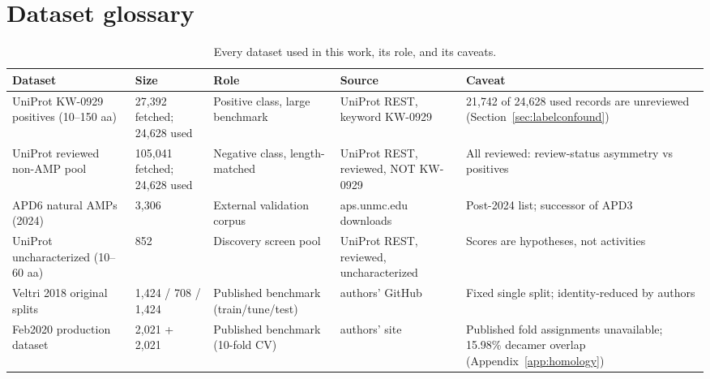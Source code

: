 
\section{Dataset glossary}\label{app:datasets}
\begin{table}[h]\centering\scriptsize
\caption{Every dataset used in this work, its role, and its caveats.}
\label{tab:datasets}
\begin{tabular}{p{3.2cm}p{1.6cm}p{2.6cm}p{3.4cm}p{4.2cm}}
\hline
Dataset & Size & Role & Source & Caveat \\
\hline
UniProt KW-0929 positives (10--150 aa) & 27{,}392 fetched; 24{,}628 used &
Positive class, large benchmark & UniProt REST, keyword KW-0929 &
21{,}742 of 24{,}628 used records are unreviewed (Section~\ref{sec:labelconfound}) \\
UniProt reviewed non-AMP pool & 105{,}041 fetched; 24{,}628 used &
Negative class, length-matched & UniProt REST, reviewed, NOT KW-0929 &
All reviewed: review-status asymmetry vs positives \\
APD6 natural AMPs (2024) & 3{,}306 & External validation corpus &
aps.unmc.edu downloads & Post-2024 list; successor of APD3 \\
UniProt uncharacterized (10--60 aa) & 852 & Discovery screen pool &
UniProt REST, reviewed, uncharacterized & Scores are hypotheses, not activities \\
Veltri 2018 original splits & 1{,}424 / 708 / 1{,}424 &
Published benchmark (train/tune/test) & authors' GitHub &
Fixed single split; identity-reduced by authors \\
Feb2020 production dataset & 2{,}021 + 2{,}021 &
Published benchmark (10-fold CV) & authors' site &
Published fold assignments unavailable; 15.98\% decamer overlap
(Appendix~\ref{app:homology}) \\
\hline
\end{tabular}
\end{table}
